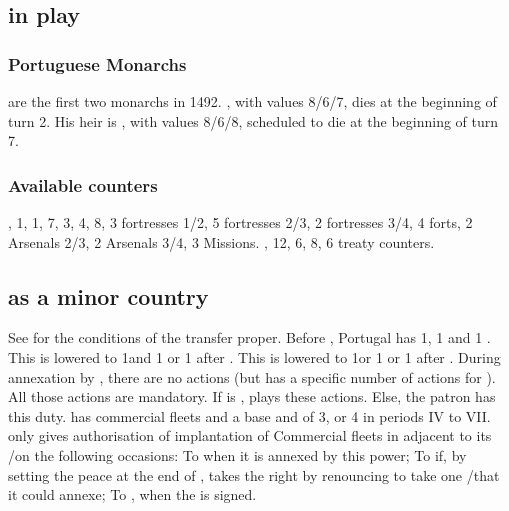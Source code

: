 \subsection{ in play}
\subsubsection{Portuguese Monarchs}
 are the
first two monarchs in 1492. , with values 8/6/7, dies
at the beginning of turn 2. His heir is , with values
8/6/8, scheduled to die at the beginning of turn 7.
\subsubsection{Available counters}
\ARMY, 1\FLEET, 1\corsaire, 7\LDND, 3\LD, 4\NTD,
8\LDENDE, 3 fortresses 1/2, 5 fortresses 2/3, 2 fortresses 3/4, 4 forts,
2 Arsenals 2/3, 2 Arsenals 3/4, 3 Missions.
\COL, 12\TP, 6\MNU, 8\TradeFLEET, 6 \ROTW treaty
counters.

\subsection{ as a minor
  country}\label{chSpecific:Portugal:Minor}
\aparag See  for the conditions
of the transfer proper.
\aparag Before , Portugal has 1\TFI,
1 \TPaction and 1 \COLaction.
\bparag This is lowered to 1\TFI and 1 \TP or 1 \COLaction after
.
\bparag This is lowered to 1\TradeFLEET or 1 \TP or 1 \COLaction after
.
\bparag During annexation by \SPA, there are no actions (but \SPA has a
specific number of actions for ). All those actions are mandatory.
\bparag If  is \Neutral, \SPA plays these actions. Else,
the patron has this duty.
\aparag {} has commercial fleets and a base \DTI and \FTI
of 3, or 4 in periods IV to VII.
\aparag {} only gives authorisation of implantation of
Commercial fleets in \STZ adjacent to its \COL/\TP on the following
occasions:
\bparag To \SPA when it is annexed by this power;
\bparag To \HOL if, by setting the peace at the end of
, \HOL takes the right by
renouncing to take one \COL/\TP that it could annexe;
\bparag To \ENG, when the  is signed.

